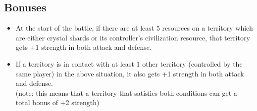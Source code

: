 \documentclass[a4paper]{article}
\begin{document}
\newpage
    \subsection{Bonuses}
        \begin{itemize}
            \item At the start of the battle,
                if there are at least 5 resources on a territory which are either
                crystal shards or its controller's civilization resource,
                that territory gets +1 strength in both attack and defense.
            \item If a territory is in contact with at least 1 other territory
                (controlled by the same player) in the above situation,
                it also gets +1 strength in both attack and defense.\\
                (note: this means that a territory that satisfies both conditions
                can get a total bonus of +2 strength)
        \end{itemize}
        
\end{document}
